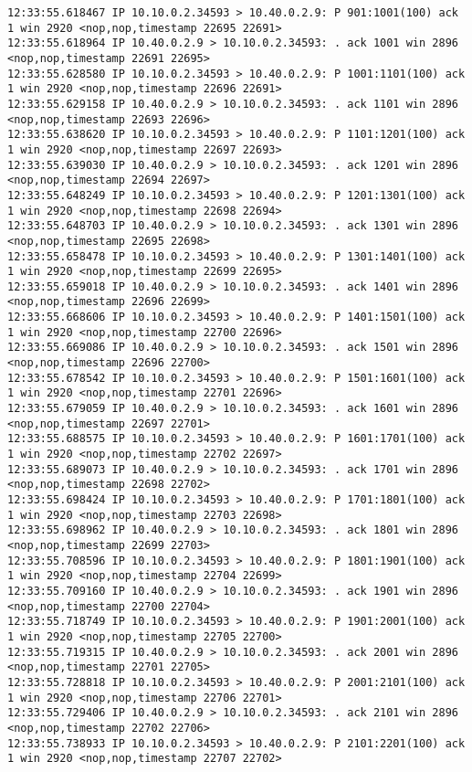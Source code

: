 \documentclass[a4paper,12pt]{article}
\begin{document}
\begin{lstlisting}
12:33:55.618467 IP 10.10.0.2.34593 > 10.40.0.2.9: P 901:1001(100) ack 1 win 2920 <nop,nop,timestamp 22695 22691>
12:33:55.618964 IP 10.40.0.2.9 > 10.10.0.2.34593: . ack 1001 win 2896 <nop,nop,timestamp 22691 22695>
12:33:55.628580 IP 10.10.0.2.34593 > 10.40.0.2.9: P 1001:1101(100) ack 1 win 2920 <nop,nop,timestamp 22696 22691>
12:33:55.629158 IP 10.40.0.2.9 > 10.10.0.2.34593: . ack 1101 win 2896 <nop,nop,timestamp 22693 22696>
12:33:55.638620 IP 10.10.0.2.34593 > 10.40.0.2.9: P 1101:1201(100) ack 1 win 2920 <nop,nop,timestamp 22697 22693>
12:33:55.639030 IP 10.40.0.2.9 > 10.10.0.2.34593: . ack 1201 win 2896 <nop,nop,timestamp 22694 22697>
12:33:55.648249 IP 10.10.0.2.34593 > 10.40.0.2.9: P 1201:1301(100) ack 1 win 2920 <nop,nop,timestamp 22698 22694>
12:33:55.648703 IP 10.40.0.2.9 > 10.10.0.2.34593: . ack 1301 win 2896 <nop,nop,timestamp 22695 22698>
12:33:55.658478 IP 10.10.0.2.34593 > 10.40.0.2.9: P 1301:1401(100) ack 1 win 2920 <nop,nop,timestamp 22699 22695>
12:33:55.659018 IP 10.40.0.2.9 > 10.10.0.2.34593: . ack 1401 win 2896 <nop,nop,timestamp 22696 22699>
12:33:55.668606 IP 10.10.0.2.34593 > 10.40.0.2.9: P 1401:1501(100) ack 1 win 2920 <nop,nop,timestamp 22700 22696>
12:33:55.669086 IP 10.40.0.2.9 > 10.10.0.2.34593: . ack 1501 win 2896 <nop,nop,timestamp 22696 22700>
12:33:55.678542 IP 10.10.0.2.34593 > 10.40.0.2.9: P 1501:1601(100) ack 1 win 2920 <nop,nop,timestamp 22701 22696>
12:33:55.679059 IP 10.40.0.2.9 > 10.10.0.2.34593: . ack 1601 win 2896 <nop,nop,timestamp 22697 22701>
12:33:55.688575 IP 10.10.0.2.34593 > 10.40.0.2.9: P 1601:1701(100) ack 1 win 2920 <nop,nop,timestamp 22702 22697>
12:33:55.689073 IP 10.40.0.2.9 > 10.10.0.2.34593: . ack 1701 win 2896 <nop,nop,timestamp 22698 22702>
12:33:55.698424 IP 10.10.0.2.34593 > 10.40.0.2.9: P 1701:1801(100) ack 1 win 2920 <nop,nop,timestamp 22703 22698>
12:33:55.698962 IP 10.40.0.2.9 > 10.10.0.2.34593: . ack 1801 win 2896 <nop,nop,timestamp 22699 22703>
12:33:55.708596 IP 10.10.0.2.34593 > 10.40.0.2.9: P 1801:1901(100) ack 1 win 2920 <nop,nop,timestamp 22704 22699>
12:33:55.709160 IP 10.40.0.2.9 > 10.10.0.2.34593: . ack 1901 win 2896 <nop,nop,timestamp 22700 22704>
12:33:55.718749 IP 10.10.0.2.34593 > 10.40.0.2.9: P 1901:2001(100) ack 1 win 2920 <nop,nop,timestamp 22705 22700>
12:33:55.719315 IP 10.40.0.2.9 > 10.10.0.2.34593: . ack 2001 win 2896 <nop,nop,timestamp 22701 22705>
12:33:55.728818 IP 10.10.0.2.34593 > 10.40.0.2.9: P 2001:2101(100) ack 1 win 2920 <nop,nop,timestamp 22706 22701>
12:33:55.729406 IP 10.40.0.2.9 > 10.10.0.2.34593: . ack 2101 win 2896 <nop,nop,timestamp 22702 22706>
12:33:55.738933 IP 10.10.0.2.34593 > 10.40.0.2.9: P 2101:2201(100) ack 1 win 2920 <nop,nop,timestamp 22707 22702>

\end{lstlisting}
\end{document}
